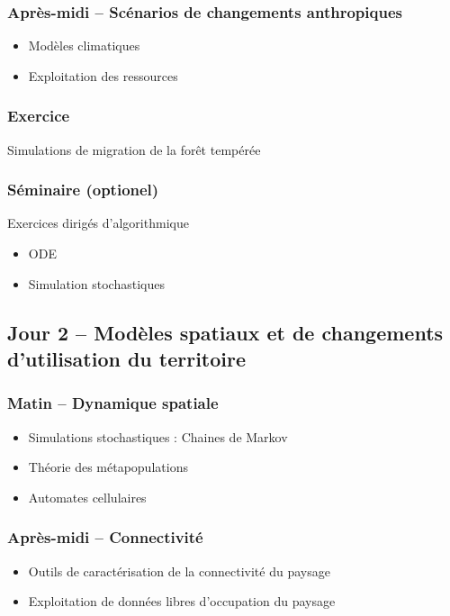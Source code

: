 \documentclass[12]{article}
\begin{document}
  \subsubsection*{Après-midi -- Scénarios de changements anthropiques}
  \begin{itemize}
    \item Modèles climatiques
    \item Exploitation des ressources
  \end{itemize}
  \subsubsection*{Exercice}
  Simulations de migration de la forêt tempérée

  \subsubsection*{Séminaire (optionel)}
  Exercices dirigés d'algorithmique
  \begin{itemize}
    \item ODE
    \item Simulation stochastiques
  \end{itemize}

  \subsection*{Jour 2 -- Modèles spatiaux et de changements d'utilisation du territoire}
  \subsubsection*{Matin -- Dynamique spatiale}
  \begin{itemize}
    \item Simulations stochastiques : Chaines de Markov
    \item Théorie des métapopulations
    \item Automates cellulaires
  \end{itemize}

  \subsubsection*{Après-midi -- Connectivité}
  \begin{itemize}
    \item Outils de caractérisation de la connectivité du paysage
    \item Exploitation de données libres d'occupation du paysage
  \end{itemize}
\end{document}
